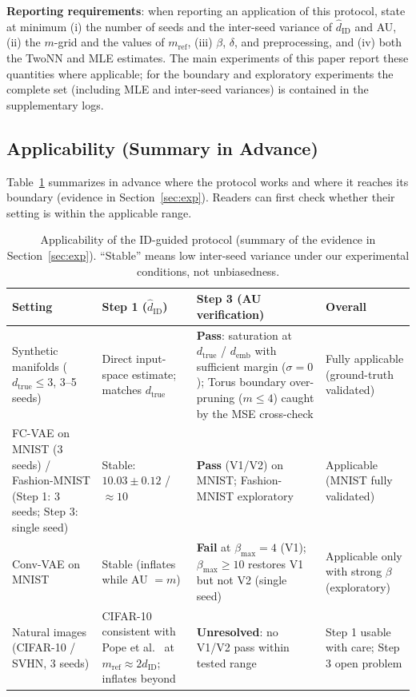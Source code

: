 \documentclass[make,article,submit,pdftex,moreauthors]{Definitions/mdpi}
\newcommand{\hatdID}{\hat{d}_{\mathrm{ID}}}
\newcommand{\dtrue}{d_{\mathrm{true}}}
\newcommand{\demb}{d_{\mathrm{emb}}}
\begin{document}
\textbf{Reporting requirements}:
when reporting an application of this protocol, state at minimum
(i) the number of seeds and the inter-seed variance of $\hatdID$ and AU,
(ii) the $m$-grid and the values of $m_{\mathrm{ref}}$,
(iii) $\beta$, $\delta$, and preprocessing, and
(iv) both the TwoNN and MLE estimates.
The main experiments of this paper report these quantities where
applicable; for the boundary and exploratory experiments the complete set
(including MLE and inter-seed variances) is contained in the supplementary
logs.

\subsection{Applicability (Summary in Advance)}\label{sec:protocol_applicability}

Table~\ref{tab:applicability} summarizes in advance where the protocol works
and where it reaches its boundary (evidence in Section~\ref{sec:exp}).
Readers can first check whether their setting is within the applicable
range.

\begin{table}[H]
\caption{Applicability of the ID-guided protocol (summary of the evidence in
Section~\ref{sec:exp}). ``Stable'' means low inter-seed variance under our
experimental conditions, not unbiasedness.}
\label{tab:applicability}
\small
\begin{tabular}{p{2.6cm}p{2.9cm}p{3.1cm}p{3.6cm}}
\toprule
\textbf{Setting} & \textbf{Step 1 ($\hatdID$)} & \textbf{Step 3 (AU verification)} & \textbf{Overall} \\
\midrule
Synthetic manifolds ($\dtrue \leq 3$, 3--5 seeds) & Direct input-space estimate; matches $\dtrue$ & \textbf{Pass}: saturation at $\dtrue$ / $\demb$ with sufficient margin ($\sigma = 0$); Torus boundary over-pruning ($m \leq 4$) caught by the MSE cross-check & Fully applicable (ground-truth validated) \\
\addlinespace
FC-VAE on MNIST (3 seeds) / Fashion-MNIST (Step 1: 3 seeds; Step 3: single seed) & Stable: $10.03 \pm 0.12$ / $\approx 10$ & \textbf{Pass} (V1/V2) on MNIST; Fashion-MNIST exploratory & Applicable (MNIST fully validated) \\
\addlinespace
Conv-VAE on MNIST & Stable (inflates while AU $= m$) & \textbf{Fail} at $\beta_{\max} = 4$ (V1); $\beta_{\max} \geq 10$ restores V1 but not V2 (single seed) & Applicable only with strong $\beta$ (exploratory) \\
\addlinespace
Natural images (CIFAR-10 / SVHN, 3 seeds) & CIFAR-10 consistent with Pope et al.~\cite{pope2021intrinsic} at $m_{\mathrm{ref}} \approx 2\hatdID$; inflates beyond & \textbf{Unresolved}: no V1/V2 pass within tested range & Step 1 usable with care; Step 3 open problem \\
\bottomrule
\end{tabular}
\end{table}
\end{document}
